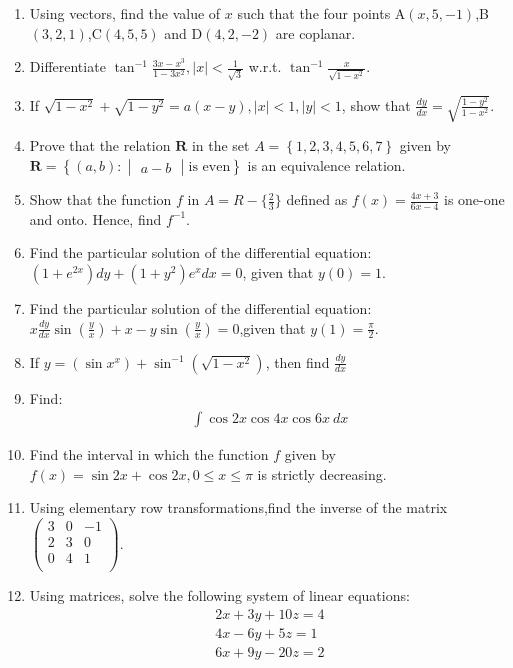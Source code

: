 \documentclass[10pt,-letter paper]{article}
\providecommand{\cbrak}[1]{\ensuremath{\left\{#1\right\}}}
\providecommand{\brak}[1]{\ensuremath{\left(#1\right)}}
\newcommand{\myvec}[1]{\ensuremath{\begin{pmatrix}#1\end{pmatrix}}}
\newcommand{\mydet}[1]{\ensuremath{\begin{vmatrix}#1\end{vmatrix}}}
\begin{document}
\begin{enumerate}
\item Using vectors, find the value of $x$ such that the four points A$\brak{x,5,-1}$,B$\brak{3,2,1}$,C$\brak{4,5,5}$ and D$\brak{4,2,-2}$ are coplanar.

\item Differentiate $\tan^{-1}\frac{3x-{x^3}}{1-3x^2},\vert{x}\vert<\frac{1}{\sqrt{3}}$ w.r.t. $\tan^{-1}\frac{x}{\sqrt{1-x^2}}$.

\item If $\sqrt{1-x^2}+\sqrt{1-y^2}=a\brak{x-y},\vert{x}\vert<1,\vert{y}\vert<1$, show that $\frac{dy}{dx}=\sqrt{\frac{1-y^2}{1-x^2}}$.

\item Prove that the relation $\mathbf{R}$ in the set $A = \cbrak{1,2,3,4,5,6,7}$ given by $\mathbf{R}=\cbrak{\brak{a,b}:\mydet{a-b}\text{is even}}$ is an equivalence relation.

\item Show that the function $f$ in $A = R-\{\frac{2}{3}\}$ defined as $f\brak{x} = \frac{4x+3}{6x-4}$ is one-one and onto. Hence, find $f^{-1}$.

\item Find the particular solution of the differential equation: $\brak{1+e^{2x}}{dy}+\brak{1+y^2}{e^{x}dx}=0$, given that $y\brak0=1$.

\item Find the particular solution of the differential equation: $x\frac{dy}{dx}\sin\brak{\frac{y}{x}}+x-y\sin\brak{\frac{y}{x}}=0$,given that $y\brak1=\frac{\pi}{2}$.

\item If $y = \brak{\sin{x}^x}+\sin^{-1}\brak{\sqrt{1-x^2}}$, then find $\frac{dy}{dx}$

\item Find:
	\begin{align*}
		\int\cos{2x}\cos{4x}\cos{6x}~dx
	\end{align*}

\item Find the interval in which the function $f$ given by $f\brak{x}=\sin2x+\cos2x,0\leq{x}\leq{\pi}$ is strictly decreasing.

\item Using elementary row transformations,find the inverse of the matrix $\myvec{3 & 0 & -1\\
	2 & 3 & 0\\
	0 & 4 & 1\\}$.

\item Using matrices, solve the following system of linear equations:
	\begin{align*}
		2x+3y+10z=4\\
		4x-6y+5z=1\\
		6x+9y-20z=2
	\end{align*}


\end{enumerate}
\end{document}
